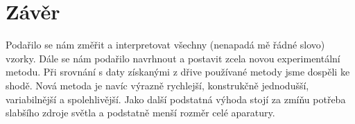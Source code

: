 \chapter*{Závěr}

Podařilo se nám změřit a interpretovat všechny (nenapadá mě řádné slovo) vzorky. Dále se nám podařilo navrhnout a postavit zcela novou experimentální metodu. 
Při srovnání s daty získanými z dřive používané metody jsme dospěli ke shodě. Nová metoda je navíc výrazně rychlejší, konstrukčně jednodušší, variabilnější a spolehlivější. 
Jako další podstatná výhoda stojí za zmíňu potřeba slabšího zdroje světla a podstatně menší rozměr celé aparatury.
